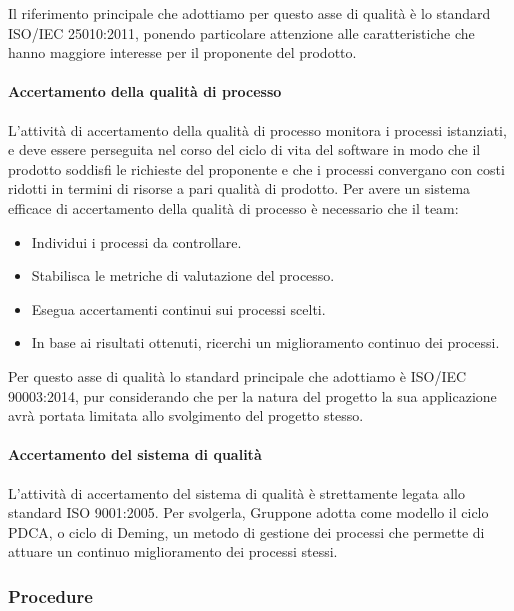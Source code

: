 \documentclass[../../norme-di-progetto.tex]{subfiles}
\begin{document}
Il riferimento principale che adottiamo per questo asse di qualità è lo standard ISO/IEC 25010:2011, ponendo particolare attenzione alle caratteristiche che hanno maggiore interesse per il proponente del prodotto.

\paragraph{Accertamento della qualità di processo}%
\label{par:accertamento_della_qualita_di_processo/attivita}

L'attività di accertamento della qualità di processo monitora i processi istanziati, e deve essere perseguita nel corso del ciclo di vita del software in modo che il prodotto soddisfi le richieste del proponente e che i processi convergano con costi ridotti in termini di risorse a pari qualità di prodotto.
Per avere un sistema efficace di accertamento della qualità di processo è necessario che il team:

\begin{itemize}
  \item Individui i processi da controllare.
  \item Stabilisca le metriche di valutazione del processo.
  \item Esegua accertamenti continui sui processi scelti.
  \item In base ai risultati ottenuti, ricerchi un miglioramento continuo dei processi.
\end{itemize}

Per questo asse di qualità lo standard principale che adottiamo è ISO/IEC 90003:2014, pur considerando che per la natura del progetto la sua applicazione avrà portata limitata allo svolgimento del progetto stesso.

\paragraph{Accertamento del sistema di qualità}%
\label{par:accertamento_del_sistema_di_qualita}

L'attività di accertamento del sistema di qualità è strettamente legata allo standard ISO 9001:2005.
Per svolgerla, Gruppone adotta come modello il ciclo PDCA, o ciclo di Deming, un metodo di gestione dei processi che permette di attuare un continuo miglioramento dei processi stessi.

\subsubsection{Procedure}%
\label{subs:accertamento_della_qualita/procedure}
\end{document}

